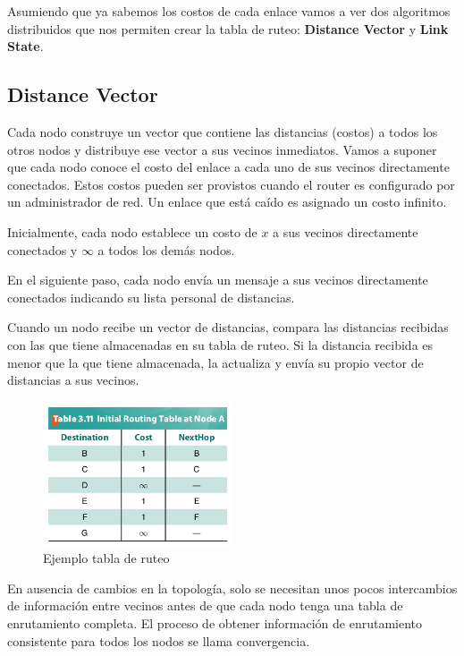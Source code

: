 Asumiendo que ya sabemos los costos de cada enlace vamos a ver dos algoritmos distribuidos que nos permiten crear la tabla de ruteo: \textbf{Distance Vector} y \textbf{Link State}.

\subsection{Distance Vector}
Cada nodo construye un vector que contiene las distancias (costos) a todos los otros nodos y distribuye ese vector a sus vecinos inmediatos. Vamos a suponer que cada nodo conoce el costo del enlace a cada uno de sus vecinos directamente conectados. Estos costos pueden ser provistos cuando el router es configurado por un administrador de red. Un enlace que está caído es asignado un costo infinito.

Inicialmente, cada nodo establece un costo de \(x\) a sus vecinos directamente conectados y \(\infty\) a todos los demás nodos.

En el siguiente paso, cada nodo envía un mensaje a sus vecinos directamente conectados indicando su lista personal de distancias.

Cuando un nodo recibe un vector de distancias, compara las distancias recibidas con las que tiene almacenadas en su tabla de ruteo. Si la distancia recibida es menor que la que tiene almacenada, la actualiza y envía su propio vector de distancias a sus vecinos.
\begin{figure}[H]
	\centering
	\includegraphics[width=0.5\textwidth
]{images/distance-vector-routing-table.png}
	\caption[Ejemplo tabla de ruteo]{Ejemplo tabla de ruteo}
	\label{fig:distance-vector-routing-table}
\end{figure}

En ausencia de cambios en la topología, solo se necesitan unos pocos intercambios de información entre vecinos antes de que cada nodo tenga una tabla de enrutamiento completa. El proceso de obtener información de enrutamiento consistente para todos los nodos se llama convergencia.

